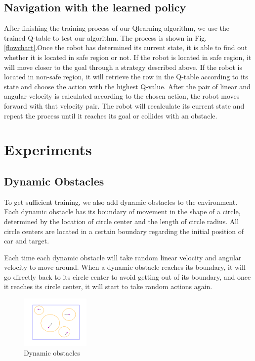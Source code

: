 \documentclass{acmtog} %
\begin{document}
	\subsection{Navigation with the learned policy}
	After finishing the training process of our Qlearning algorithm, we use the trained Q-table to test our algorithm. The process is shown in Fig. \ref{flowchart}.Once the robot has determined its current state, it is
	able to find out whether it is located in safe region or not. If the robot is located in safe region, it will move closer
	to the goal through a strategy described above. If the robot is located in non-safe region, it will retrieve the row
	in the Q-table according to its state and choose the action with the highest Q-value. After the pair of
	linear and angular velocity is calculated according to the chosen action, the robot moves forward with that velocity pair. The robot will recalculate its current state and repeat the process until it reaches its goal or collides with an obstacle.
\section{Experiments}
\subsection{Dynamic Obstacles}
To get sufficient training, we also add dynamic obstacles to the environment. Each dynamic obstacle has its boundary of movement in the shape of a circle, determined by the location of circle center and the length of circle radius. All circle centers are located in a certain boundary regarding the initial position of car and target.

Each time each dynamic obstacle will take random linear velocity and angular velocity to move around. When a dynamic obstacle reaches its boundary, it will go directly back to its circle center to avoid getting out of its boundary, and once it reaches its circle center, it will start to take random actions again.
	\begin{figure}[H]
	\centering
	\includegraphics[width=0.3\textwidth]{fig1.PNG}
	\caption{Dynamic obstacles}
\end{figure}
\end{document}
